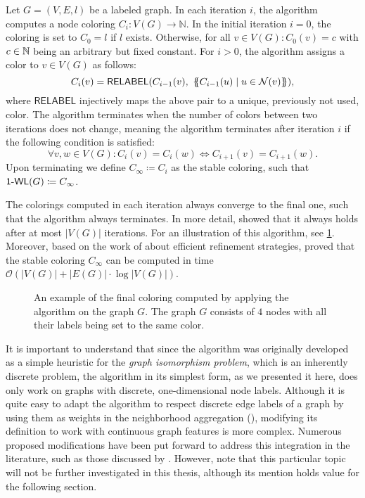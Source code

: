 \begin{definition}[$\wl$ Algorithm]
    Let $G = (V, E, l)$ be a labeled graph. In each iteration $i$, the \wl algorithm computes a node coloring $C_i: V(G) \rightarrow \mathbb{N}$. In the initial iteration $i=0$, the coloring is set to $C_0 = l$ if $l$ exists. Otherwise, for all $v \in V(G): C_0(v) = c$ with $c \in \mathbb{N}$ being an arbitrary but fixed constant. For $i > 0$, the algorithm assigns a color to $v \in V(G)$ as follows:
    \begin{equation*}
        C_i (v) = \textsf{RELABEL}(C_{i-1}(v),  \ \{\!\!\{ C_{i-1}(u) \mid u \in \mathcal{N}(v) \}\!\!\}),
    \end{equation*}
    where $\textsf{RELABEL}$ injectively maps the above pair to a unique, previously not used, color. The algorithm terminates when the number of colors between two iterations does not change, meaning the algorithm terminates after iteration $i$ if the following condition is satisfied:
    \begin{equation*}
        \forall v,w \in V(G):  C_i(v) = C_i(w) \iff C_{i+1}(v) = C_{i+1}(w).
    \end{equation*}
    Upon terminating we define $C_{\infty} \coloneqq C_i$ as the stable coloring, such that $\textsf{1-WL}(G) \coloneqq C_\infty$.
\end{definition}

The colorings computed in each iteration always converge to the final one, such that the algorithm always terminates. In more detail, \cite{Gro2017} showed that it always holds after at most $|V(G)|$ iterations. For an illustration of this algorithm, see \cref{fig:1wl_example}. Moreover, based on the work of \cite{Pai+87} about efficient refinement strategies, \cite{Car+82} proved that the stable coloring $C_\infty$ can be computed in time $\mathcal{O}(| V(G) | + |E(G)| \cdot \log | V(G) |)$.

\begin{figure}[H]
    \centering
    
    \caption{An example of the final coloring computed by applying the \wl algorithm on the graph $G$. The graph $G$ consists of $4$ nodes with all their labels being set to the same color.}
    \label{fig:1wl_example}
\end{figure}

It is important to understand that since the algorithm was originally developed as a simple heuristic for the \textit{graph isomorphism problem}, which is an inherently discrete problem, the \wl algorithm in its simplest form, as we presented it here, does only work on graphs with discrete, one-dimensional node labels. Although it is quite easy to adapt the algorithm to respect discrete edge labels of a graph by using them as weights in the neighborhood aggregation (\cite{Shervashidze2011}), modifying its definition to work with continuous graph features is more complex. Numerous proposed modifications have been put forward to address this integration in the literature, such as those discussed by \cite{Mor+2016}. However, note that this particular topic will not be further investigated in this thesis, although its mention holds value for the following section.

